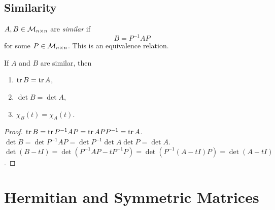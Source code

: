 \documentclass[10pt]{article}
\begin{document}
    \subsection{Similarity}
    \begin{definition}
        $ A,B\in {\mathcal{M}}_{n\times n} $ are \textit{similar} if 
        \[
            B=P^{-1}AP
        \]
        for some $ P\in {\mathcal{M}}_{n \times n} $. This is an equivalence relation.
    \end{definition}
    \begin{proposition}
        If $A$ and $B$ are similar, then 
        \begin{enumerate}
            \item $ \tr B=\tr A $,
            \item $ \det B=\det A $,
            \item $ \chi_B(t)=\chi_A(t) $.
        \end{enumerate}
    \end{proposition}
    \begin{proof}
        $ \tr B=\tr P^{-1}AP=\tr APP^{-1}=\tr A $. \\
        $ \det B=\det P^{-1}AP=\det P^{-1}\det A \det P=\det A $. \\
        $ \det (B-tI)=\det (P^{-1}AP-tP^{-1}P)=\det (P^{-1}(A-tI)P)=\det (A-tI) $.
    \end{proof}
    \section{Hermitian and Symmetric Matrices}
\end{document}
